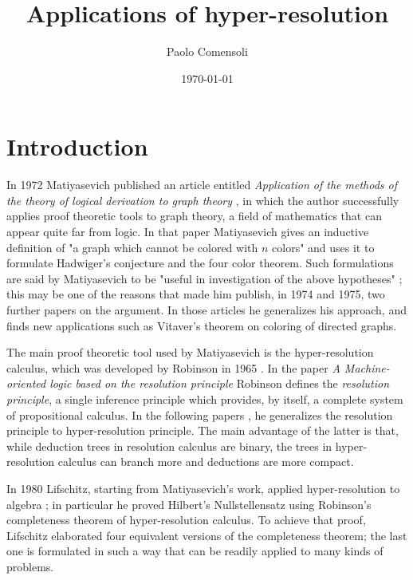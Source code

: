 \documentclass[a4paper,12pt,oneside]{book}
\title{Applications of hyper-resolution}
\author{Paolo Comensoli}
\date{\today}
\def \Myparskip {1mm} \setlength{\parskip}{\Myparskip}         %
\begin{document}
 

%





\setlength{\parskip}{-0.65mm}%
\setcounter{page}{1}
\tableofcontents
\thispagestyle{empty}
\newpage
\setlength{\parskip}{\Myparskip} 



\chapter*{Introduction} %

In 1972 Matiyasevich published an article entitled \textit{Application of the methods of the theory of logical derivation to graph theory} \cite{mat-2}, in which the author successfully applies proof theoretic tools to graph theory, a field of mathematics that can appear quite far from logic. 
In that paper Matiyasevich  gives an inductive definition of "a graph which cannot be colored with $n$ colors" and uses it to formulate  Hadwiger's conjecture and the four color theorem. 
Such formulations are said by  Matiyasevich to be "useful in investigation of the above hypotheses" \cite{mat-2}; this may be one of the reasons that made him publish, in 1974 and 1975, two further papers \cite{mat-3,mat-1} on the argument.
 In those articles he generalizes his approach, and finds new applications such as Vitaver's theorem on coloring of directed graphs.

The main proof theoretic tool used by Matiyasevich is the hyper-resolution calculus, which was developed by Robinson in 1965 \cite{robinson,rob,robinson-general}. 
In the paper \textit{A Machine-oriented logic based on the resolution principle} \cite{robinson} Robinson defines the \textit{resolution principle}, a single inference principle which provides, by itself, a complete system of propositional calculus.  
In the following papers  \cite{rob,robinson-general}, he generalizes the resolution principle to hyper-resolution principle. 
The main advantage of the latter  is that, while deduction trees in resolution calculus are binary, the trees in hyper-resolution calculus can branch more  and deductions are more compact.


\newpage\vspace*{1mm}
In 1980 Lifschitz, starting from Matiyasevich's work, applied hyper-resolution to algebra \cite{lifschitz}; in particular he proved Hilbert's Nullstellensatz using Robinson's completeness theorem of hyper-resolution calculus. 
To achieve that proof, Lifschitz elaborated four equivalent versions of the completeness theorem; the last one is formulated in such a way that can be readily applied to many kinds of problems.
\end{document}
